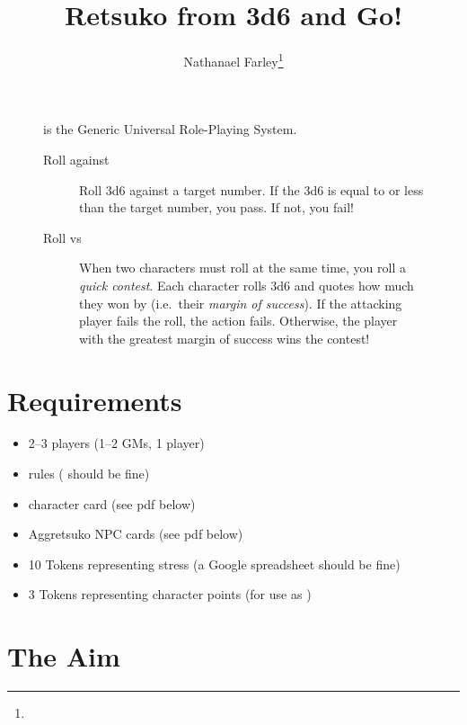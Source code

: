 \documentclass[onepage]{memoir}
\begin{document}
\title{Retsuko from 3d6 and Go!}
\author{Nathanael Farley\thanks{}}
\maketitle
\clearpage



\begin{multicols}{2}
  \begin{figure}[b]
    \centering
    \begin{tcolorbox}[title={What is `GURPS'?}]
      \gurps is the Generic Universal Role-Playing System.
      \begin{description}
      \item[Roll against] Roll 3d6 against a target number. If the 3d6 is equal
        to or less than the target number, you pass. If not, you fail!
      \item[Roll vs] When two characters must roll at the same time, you roll a
        \emph{quick contest}. Each character rolls 3d6 and quotes how much they
        won by (i.e.~their \emph{margin of success}). If the attacking player
        fails the roll, the action fails. Otherwise, the player with the greatest margin
        of success wins the contest!
      \end{description}
    \end{tcolorbox}
  \end{figure}
\section{Requirements}
\label{sec:requirements}


\begin{itemize}
\item 2--3 players (1--2 GMs, 1 player)
\item \gurps rules ( should be fine)
\item \retsuko character card (see pdf below)
\item Aggretsuko NPC cards (see pdf below)
\item 10 Tokens representing stress (a Google spreadsheet should be fine)
\item 3 Tokens representing character points (for use as )
\end{itemize}

\section{The Aim}
\label{sec:aim}


\end{multicols}
\end{document}
